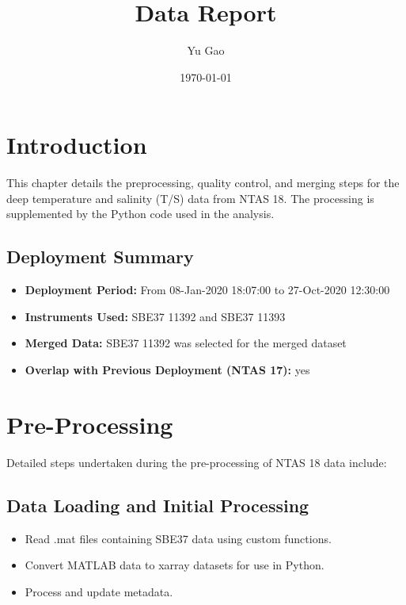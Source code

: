 \documentclass[11pt]{article}
\title{\displayprojectname{} \casenumber{} Data Report}
\author{Yu Gao}
\date{\today}
\newcommand{\HasNextDeploymentOverlap}{yes}  %
\newcommand{\projectname}{NTAS}  %
\newcommand{\casenumber}{18}  %
\newcommand{\previouscasenumber}{17}  %
\newcommand{\FirstInstrumentType}{SBE37}  %
\newcommand{\SecondInstrumentType}{SBE37}  %
\newcommand{\DeploymentSpike}{08-Jan-2020 18:07:00} %
\newcommand{\RecoverySpike}{27-Oct-2020 12:30:00} %
\newcommand{\FirstInstrument}{11392}
\newcommand{\SecondInstrument}{11393}
\newcommand{\CurrentDeploymentInstrument}{\FirstInstrumentType{} \FirstInstrument}  %
\begin{document}
\maketitle
\tableofcontents
\newpage

\section{Introduction}
This chapter details the preprocessing, quality control, 
and merging steps for the deep temperature and salinity (T/S) data from \projectname{} \casenumber{}.
The processing is supplemented by the Python code used in the analysis.

\subsection{Deployment Summary}
\begin{itemize}
    \item \textbf{Deployment Period:} From \DeploymentSpike{} to \RecoverySpike{}
    \item \textbf{Instruments Used:} \FirstInstrumentType{} \FirstInstrument{} and \SecondInstrumentType{} \SecondInstrument{}
    \item \textbf{Merged Data:} \CurrentDeploymentInstrument{} was selected for the merged dataset
    \item \textbf{Overlap with Previous Deployment (\projectname{} \previouscasenumber{}):} \HasNextDeploymentOverlap{}
\end{itemize}

\section{Pre-Processing}
Detailed steps undertaken during the pre-processing of \projectname{} \casenumber{} data include:

\subsection{Data Loading and Initial Processing}
\begin{itemize}
\item Read .mat files containing \FirstInstrumentType{} data using custom functions.
\item Convert MATLAB data to xarray datasets for use in Python.
\item Process and update metadata.
\end{itemize}
\end{document}

